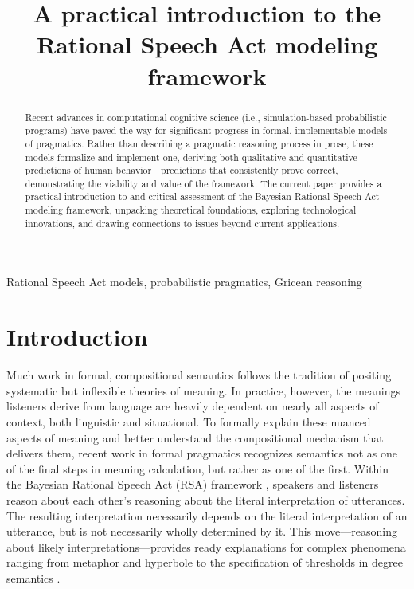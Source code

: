 \documentclass{sp}
\title[Practical introduction to RSA]{A practical introduction to the Rational Speech Act modeling framework%
	}
\author[]{%
	\spauthor{Gregory Scontras \\ \institute{University of California, Irvine}} \AND
	\spauthor{Michael Henry Tessler \\ \institute{Massachusetts Institute of Technology}} \AND
	\spauthor{Michael Franke \\ \institute{University of Osnabr\"{u}ck}}
}
\begin{document}
\maketitle

\begin{abstract}
	Recent advances in computational cognitive science (i.e., simulation-based probabilistic programs) have paved the way for significant progress in formal, implementable models of pragmatics. Rather than describing a pragmatic reasoning process in prose, these models formalize and implement one, deriving both qualitative and quantitative predictions of human behavior---predictions that consistently prove correct, demonstrating the viability and value of the framework. The current paper provides a practical introduction to and critical assessment of the Bayesian Rational Speech Act modeling framework, unpacking theoretical foundations, exploring technological innovations, and drawing connections to issues beyond current applications. 
\end{abstract}

\begin{keywords}
	Rational Speech Act models, probabilistic pragmatics, Gricean reasoning
\end{keywords}


\section{Introduction}

Much work in formal, compositional semantics follows the tradition of positing systematic but inflexible theories of meaning. In practice, however, the meanings listeners derive from language are heavily dependent on nearly all aspects of context, both linguistic and situational. To formally explain these nuanced aspects of meaning and better understand the compositional mechanism that delivers them, recent work in formal pragmatics recognizes semantics not as one of the final steps in meaning calculation, but rather as one of the first. Within the Bayesian Rational Speech Act (RSA) framework \citep{goodmanfrank2016,frankejaeger2016}, speakers and listeners reason about each other's reasoning about the literal interpretation of utterances. The resulting interpretation necessarily depends on the literal interpretation of an utterance, but is not necessarily wholly determined by it. This move---reasoning about likely interpretations---provides ready explanations for complex phenomena ranging from metaphor \citep{kaoetal2014metaphor} and hyperbole \citep{kaoetal2014} to the specification of thresholds in degree semantics \citep{lassitergoodman2013}.
\end{document}
